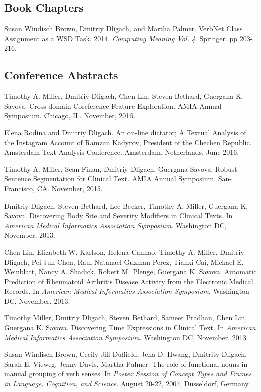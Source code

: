 \documentclass[letterpaper]{article}
\renewenvironment{itemize}{
  \begin{list}{}{
    \setlength{\leftmargin}{1.5em}
  }
}{
  \end{list}
}
\begin{document}
\subsection*{Book Chapters}
\begin{itemize}
\item Susan Windisch Brown, Dmitriy Dligach, and Martha Palmer. VerbNet Class Assignment as a WSD Task. 2014. \emph{Computing Meaning Vol. 4}. Springer. pp 203-216.
\end{itemize}

\subsection*{Conference Abstracts}
\begin{itemize}
\item Timothy A. Miller, Dmitriy Dligach, Chen Lin, Steven Bethard, Guergana K. Savova. Cross-domain Coreference Feature Exploration. AMIA Annual Symposium. Chicago, IL. November, 2016.
\item Elena Rodina and Dmitriy Dligach. An on-line dictator; A Textual Analysis of the Instagram Account of Ramzan Kadyrov, President of the Chechen Republic. Amsterdam Text Analysis Conference. Amsterdam, Netherlands. June 2016.
\item Timothy A. Miller, Sean Finan, Dmitriy Dligach, Guergana Savova. Robust Sentence Segmentation for Clinical Text. AMIA Annual Symposium. San-Francisco, CA. November, 2015.
\item Dmitriy Dligach, Steven Bethard, Lee Becker, Timothy A. Miller, Guergana K. Savova. Discovering Body Site and Severity Modifiers in Clinical Texts. In \emph{American Medical Informatics Association Symposium}. Washington DC, November, 2013.
\item Chen Lin, Elizabeth W. Karlson, Helena Canhao, Timothy A. Miller, Dmitriy Dligach, Pei Jun Chen, Raul Natanael Guzman Perez, Tianxi Cai, Michael E. Weinblatt, Nancy A. Shadick, Robert M. Plenge, Guergana K. Savova. Automatic Prediction of Rheumatoid Arthritis Disease Activity from the Electronic Medical Records. In \emph{American Medical Informatics Association Symposium}. Washington DC, November, 2013.
\item Timothy Miller, Dmitriy Dligach, Steven Bethard, Sameer Pradhan, Chen Lin, Guergana K. Savova. Discovering Time Expressions in Clinical Text. In \emph{American Medical Informatics Association Symposium}. Washington DC, November, 2013.
\item Susan Windisch Brown, Cecily Jill Duffield, Jena D. Hwang, Dmitrity Dligach, Sarah E. Vieweg, Jenny Davis, Martha Palmer. The role of functional nouns in manual grouping of verb senses. In \emph {Poster Session of Concept Types and Frames in Language, Cognition, and Science}. August 20-22, 2007, Dusseldorf, Germany.
\end{itemize}
\end{document}
